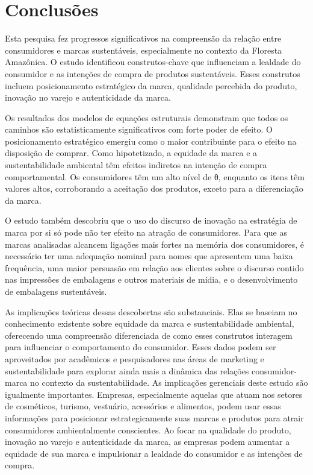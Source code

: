 \section{Conclusões}

Esta pesquisa fez progressos significativos na compreensão da relação entre consumidores e marcas sustentáveis, especialmente no contexto da Floresta Amazônica. O estudo identificou construtos-chave que influenciam a lealdade do consumidor e as intenções de compra de produtos sustentáveis. Esses construtos incluem posicionamento estratégico da marca, qualidade percebida do produto, inovação no varejo e autenticidade da marca.

Os resultados dos modelos de equações estruturais demonstram que todos os caminhos são estatisticamente significativos com forte poder de efeito. O posicionamento estratégico emergiu como o maior contribuinte para o efeito na disposição de comprar. Como hipotetizado, a equidade da marca e a sustentabilidade ambiental têm efeitos indiretos na intenção de compra comportamental. Os consumidores têm um alto nível de θ, enquanto os itens têm valores altos, corroborando a aceitação dos produtos, exceto para a diferenciação da marca.

O estudo também descobriu que o uso do discurso de inovação na estratégia de marca por si só pode não ter efeito na atração de consumidores. Para que as marcas analisadas alcancem ligações mais fortes na memória dos consumidores, é necessário ter uma adequação nominal para nomes que apresentem uma baixa frequência, uma maior persuasão em relação aos clientes sobre o discurso contido nas impressões de embalagens e outros materiais de mídia, e o desenvolvimento de embalagens sustentáveis.

As implicações teóricas dessas descobertas são substanciais. Elas se baseiam no conhecimento existente sobre equidade da marca e sustentabilidade ambiental, oferecendo uma compreensão diferenciada de como esses construtos interagem para influenciar o comportamento do consumidor. Esses dados podem ser aproveitados por acadêmicos e pesquisadores nas áreas de marketing e sustentabilidade para explorar ainda mais a dinâmica das relações consumidor-marca no contexto da sustentabilidade.
As implicações gerenciais deste estudo são igualmente importantes. Empresas, especialmente aquelas que atuam nos setores de cosméticos, turismo, vestuário, acessórios e alimentos, podem usar essas informações para posicionar estrategicamente suas marcas e produtos para atrair consumidores ambientalmente conscientes. Ao focar na qualidade do produto, inovação no varejo e autenticidade da marca, as empresas podem aumentar a equidade de sua marca e impulsionar a lealdade do consumidor e as intenções de compra.

